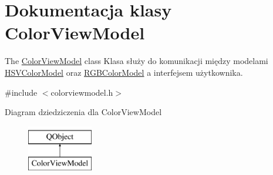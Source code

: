 \hypertarget{class_color_view_model}{}\section{Dokumentacja klasy Color\+View\+Model}
\label{class_color_view_model}


The \mbox{\hyperlink{class_color_view_model}{Color\+View\+Model}} class Klasa służy do komunikacji między modelami \mbox{\hyperlink{class_h_s_v_color_model}{H\+S\+V\+Color\+Model}} oraz \mbox{\hyperlink{class_r_g_b_color_model}{R\+G\+B\+Color\+Model}} a interfejsem użytkownika.  




{\ttfamily \#include $<$colorviewmodel.\+h$>$}

Diagram dziedziczenia dla Color\+View\+Model\begin{figure}[H]
\begin{center}
\leavevmode
\includegraphics[height=2.000000cm]{class_color_view_model}
\end{center}
\end{figure}
